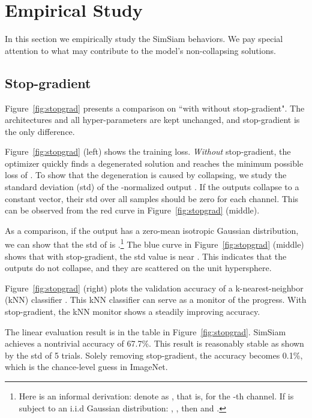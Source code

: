 \documentclass[final]{cvpr}
\begin{document}
\section{Empirical Study\label{sec:exp}}

In this section we empirically study the SimSiam behaviors. We pay special attention to what may contribute to the model's non-collapsing solutions. 

\subsection{Stop-gradient}\label{subsec:stopgrad}

Figure~\ref{fig:stopgrad} presents a comparison on ``with \vs without stop-gradient". The architectures and all hyper-parameters are kept unchanged, and stop-gradient is the only difference.

Figure~\ref{fig:stopgrad} (left) shows the training loss. \emph{Without} stop-gradient, the optimizer quickly finds a degenerated solution and reaches the minimum possible loss of .
To show that the degeneration is caused by collapsing, we study the standard deviation (std) of the -normalized output . If the outputs collapse to a constant vector, their std over all samples should be zero for each channel.
This can be observed from the red curve in Figure~\ref{fig:stopgrad} (middle). 

As a comparison, if the output  has a zero-mean isotropic Gaussian distribution, we can show that the std of  is .\footnote{
Here is an informal derivation:
denote  as , that is,  for the -th channel.
If  is subject to an i.i.d Gaussian distribution: , , then  and .
} 
The blue curve in Figure~\ref{fig:stopgrad} (middle) shows that with stop-gradient, the std value is near . This indicates that the outputs do not collapse, and they are scattered on the unit hypersphere.

Figure~\ref{fig:stopgrad} (right) plots the validation accuracy of a k-nearest-neighbor (kNN) classifier \cite{Wu2018a}. This kNN classifier can serve as a monitor of the progress. With stop-gradient, the kNN monitor shows a steadily improving accuracy.

The linear evaluation result is in the table in Figure~\ref{fig:stopgrad}. SimSiam achieves a nontrivial accuracy of 67.7\%. This result is reasonably stable as shown by the std of 5 trials.
Solely removing stop-gradient, the accuracy becomes 0.1\%, which is the chance-level guess in ImageNet.
\end{document}
